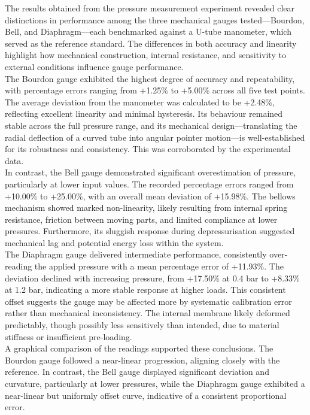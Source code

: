 \documentclass{article}
\begin{document}
The results obtained from the pressure measurement experiment revealed clear distinctions in performance among the three mechanical gauges tested—Bourdon, Bell, and Diaphragm—each benchmarked against a U-tube manometer, which served as the reference standard. The differences in both accuracy and linearity highlight how mechanical construction, internal resistance, and sensitivity to external conditions influence gauge performance.\\[8pt]
The Bourdon gauge exhibited the highest degree of accuracy and repeatability, with percentage errors ranging from +1.25\% to +5.00\% across all five test points. The average deviation from the manometer was calculated to be +2.48\%, reflecting excellent linearity and minimal hysteresis. Its behaviour remained stable across the full pressure range, and its mechanical design—translating the radial deflection of a curved tube into angular pointer motion—is well-established for its robustness and consistency. This was corroborated by the experimental data.\\[8pt]
In contrast, the Bell gauge demonstrated significant overestimation of pressure, particularly at lower input values. The recorded percentage errors ranged from +10.00\% to +25.00\%, with an overall mean deviation of +15.98\%. The bellows mechanism showed marked non-linearity, likely resulting from internal spring resistance, friction between moving parts, and limited compliance at lower pressures. Furthermore, its sluggish response during depressurisation suggested mechanical lag and potential energy loss within the system.\\[8pt]
The Diaphragm gauge delivered intermediate performance, consistently over-reading the applied pressure with a mean percentage error of +11.93\%. The deviation declined with increasing pressure, from +17.50\% at 0.4 bar to +8.33\% at 1.2 bar, indicating a more stable response at higher loads. This consistent offset suggests the gauge may be affected more by systematic calibration error rather than mechanical inconsistency. The internal membrane likely deformed predictably, though possibly less sensitively than intended, due to material stiffness or insufficient pre-loading.\\[8pt]
A graphical comparison of the readings supported these conclusions. The Bourdon gauge followed a near-linear progression, aligning closely with the reference. In contrast, the Bell gauge displayed significant deviation and curvature, particularly at lower pressures, while the Diaphragm gauge exhibited a near-linear but uniformly offset curve, indicative of a consistent proportional error.
\end{document}
